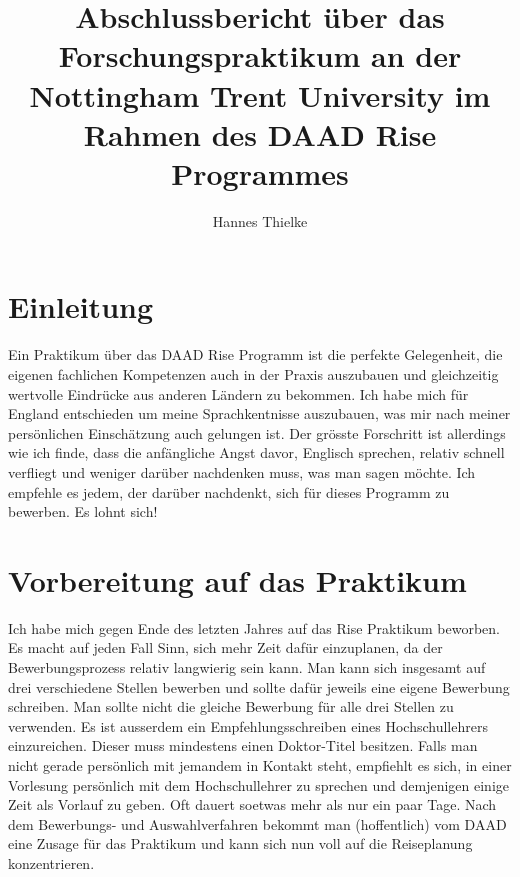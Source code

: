 \documentclass{article}
\title{Abschlussbericht \"uber das Forschungspraktikum an der Nottingham Trent University im Rahmen des DAAD Rise Programmes}
\author{Hannes Thielke}
\begin{document}
\maketitle         %


\newpage                %

\section{Einleitung}
Ein Praktikum \"uber das DAAD Rise Programm ist die perfekte Gelegenheit, die eigenen fachlichen Kompetenzen auch in der Praxis auszubauen und gleichzeitig wertvolle Eindr\"ucke aus anderen L\"andern zu bekommen. 
Ich habe mich f\"ur England entschieden um meine Sprachkentnisse auszubauen, was mir nach meiner pers\"onlichen Einsch\"atzung auch gelungen ist. Der gr\"osste Forschritt ist allerdings wie ich finde, dass die anf\"angliche Angst davor, Englisch sprechen, relativ schnell verfliegt und weniger dar\"uber nachdenken muss, was man sagen m\"ochte.
Ich empfehle es jedem, der dar\"uber nachdenkt, sich f\"ur dieses Programm zu bewerben. Es lohnt sich!

\section{Vorbereitung auf das Praktikum}
Ich habe mich gegen Ende des letzten Jahres auf das Rise Praktikum beworben.  Es macht auf jeden Fall Sinn, sich mehr Zeit daf\"ur einzuplanen, da der Bewerbungsprozess relativ langwierig sein kann. Man kann sich insgesamt auf drei verschiedene Stellen bewerben und sollte daf\"ur jeweils eine eigene Bewerbung schreiben. Man sollte nicht die gleiche Bewerbung f\"ur alle drei Stellen zu verwenden.
Es ist ausserdem ein Empfehlungsschreiben eines Hochschullehrers einzureichen. Dieser muss mindestens einen Doktor-Titel besitzen. Falls man nicht gerade pers\"onlich mit jemandem in Kontakt steht, empfiehlt es sich, in einer Vorlesung pers\"onlich mit dem Hochschullehrer zu sprechen und demjenigen einige Zeit als Vorlauf zu geben. Oft dauert soetwas mehr als nur ein paar Tage.
Nach dem Bewerbungs- und Auswahlverfahren bekommt man (hoffentlich) vom DAAD eine Zusage f\"ur das Praktikum und kann sich nun voll auf die Reiseplanung konzentrieren.
\end{document}
